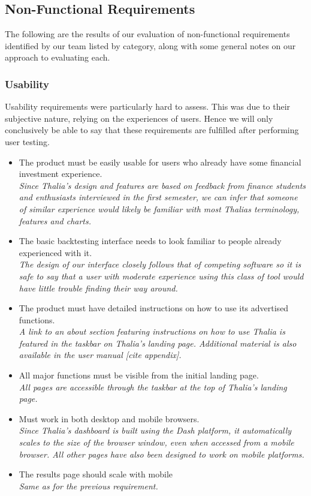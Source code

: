 \documentclass[main.tex]{subfiles}
\begin{document}
\subsection{Non-Functional Requirements}
The following are the results of our evaluation of non-functional requirements identified by our team listed by category, along with some general notes on our approach to evaluating each.

\subsubsection{Usability}
Usability requirements were particularly hard to assess. This was due to their subjective nature, relying on the experiences of users. Hence we will only conclusively be able to say that these requirements are fulfilled after performing user testing.

\begin{itemize}

\item The product must be easily usable for users who already have some ﬁnancial investment experience.\\
\textit{Since Thalia’s design and features are based on feedback from finance students and enthusiasts interviewed in the first semester, we can infer that someone of similar experience would likely be familiar with most Thalias terminology, features and charts.}
\item The basic backtesting interface needs to look familiar to people already experienced with it. \\
\textit{The design of our interface closely follows that of competing software so it is safe to say that a user with moderate experience using this class of tool would have little trouble finding their way around.}

\item The product must have detailed instructions on how to use its advertised functions.\\
\textit{A link to an about section featuring instructions on how to use Thalia is featured in the taskbar on Thalia’s landing page. Additional material is also available in the user manual [cite appendix].} 
\item All major functions must be visible from the initial landing page.\\
\textit{All pages are accessible through the taskbar at the top of Thalia’s landing page.}
\item Must work in both desktop and mobile browsers.\\
\textit{Since Thalia’s dashboard is built using the Dash platform, it automatically scales to the size of the browser window, even when accessed from a mobile browser. All other pages have also been designed to work on mobile platforms.}
\item The results page should scale with mobile\\
\textit{Same as for the previous requirement.}

\end{itemize}
\end{document}
